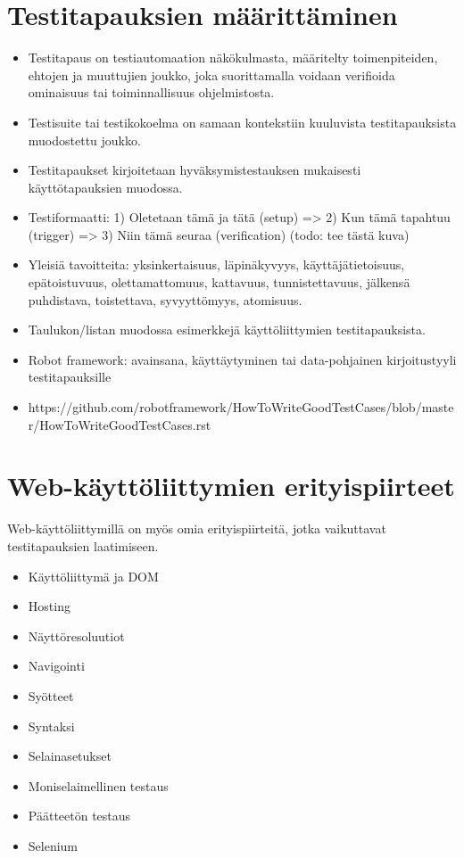 \section{Testitapauksien määrittäminen} \label{ch:08_testitapauksien_maarittaminen}

  \begin{itemize}
    \item Testitapaus on testiautomaation näkökulmasta, määritelty toimenpiteiden, ehtojen ja muuttujien joukko, joka suorittamalla voidaan verifioida ominaisuus tai toiminnallisuus ohjelmistosta.
    \item Testisuite tai testikokoelma on samaan kontekstiin kuuluvista testitapauksista muodostettu joukko.
    \item Testitapaukset kirjoitetaan hyväksymistestauksen mukaisesti käyttötapauksien muodossa.
    \item Testiformaatti: 1) Oletetaan tämä ja tätä (setup) => 2) Kun tämä tapahtuu (trigger) => 3) Niin tämä seuraa (verification) (todo: tee tästä kuva)
    \item Yleisiä tavoitteita: yksinkertaisuus, läpinäkyvyys, käyttäjätietoisuus, epätoistuvuus, olettamattomuus, kattavuus, tunnistettavuus, jälkensä puhdistava, toistettava, syvyyttömyys, atomisuus.
    \item Taulukon/listan muodossa esimerkkejä käyttöliittymien testitapauksista.
    \item Robot framework: avainsana, käyttäytyminen tai data-pohjainen kirjoitustyyli testitapauksille
    \item https://github.com/robotframework/HowToWriteGoodTestCases/blob/master/HowToWriteGoodTestCases.rst
  \end{itemize}

\section{Web-käyttöliittymien erityispiirteet} \label{ch:08_webkayttoliittymien_erityispiirteet}

  Web-käyttöliittymillä on myös omia erityispiirteitä, jotka vaikuttavat testitapauksien laatimiseen.

  \begin{itemize}
    \item Käyttöliittymä ja DOM
    \item Hosting
    \item Näyttöresoluutiot
    \item Navigointi
    \item Syötteet
    \item Syntaksi
    \item Selainasetukset
    \item Moniselaimellinen testaus
    \item Päätteetön testaus
    \item Selenium
  \end{itemize}

